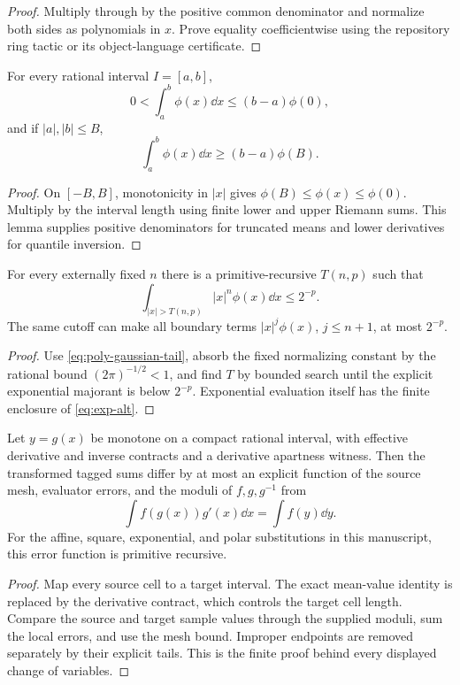 \begin{proof}
Multiply through by the positive common denominator and normalize both sides as polynomials in $x$.  Prove equality coefficientwise using the repository ring tactic or its object-language certificate.
\end{proof}

\begin{lemma}\label{lem:anti-concentration}
For every rational interval $I=[a,b]$,
\[
 0<\int_a^b\phi(x)\dd x
 \le (b-a)\phi(0),
\]
and if $|a|,|b|\le B$,
\[
 \int_a^b\phi(x)\dd x
 \ge(b-a)\phi(B).
\]
\end{lemma}

\begin{proof}
On $[-B,B]$, monotonicity in $|x|$ gives
$\phi(B)\le\phi(x)\le\phi(0)$.  Multiply by the interval length using finite lower and upper Riemann sums.  This lemma supplies positive denominators for truncated means and lower derivatives for quantile inversion.
\end{proof}

\begin{lemma}\label{lem:moment-tail}
For every externally fixed $n$ there is a primitive-recursive $T(n,p)$ such that
\[
 \int_{|x|>T(n,p)}|x|^n\phi(x)\dd x\le2^{-p}.
\]
The same cutoff can make all boundary terms $|x|^j\phi(x)$, $j\le n+1$, at most $2^{-p}$.
\end{lemma}

\begin{proof}
Use \eqref{eq:poly-gaussian-tail}, absorb the fixed normalizing constant by the rational bound $(2\pi)^{-1/2}<1$, and find $T$ by bounded search until the explicit exponential majorant is below $2^{-p}$.  Exponential evaluation itself has the finite enclosure of \eqref{eq:exp-alt}.
\end{proof}

\begin{lemma}\label{lem:finite-cov}
Let $y=g(x)$ be monotone on a compact rational interval, with effective derivative and inverse contracts and a derivative apartness witness.  Then the transformed tagged sums differ by at most an explicit function of the source mesh, evaluator errors, and the moduli of $f,g,g^{-1}$ from
\[
 \int f(g(x))g'(x)\dd x=\int f(y)\dd y.
\]
For the affine, square, exponential, and polar substitutions in this manuscript, this error function is primitive recursive.
\end{lemma}

\begin{proof}
Map every source cell to a target interval.  The exact mean-value identity is replaced by the derivative contract, which controls the target cell length.  Compare the source and target sample values through the supplied moduli, sum the local errors, and use the mesh bound.  Improper endpoints are removed separately by their explicit tails.  This is the finite proof behind every displayed change of variables.
\end{proof}
